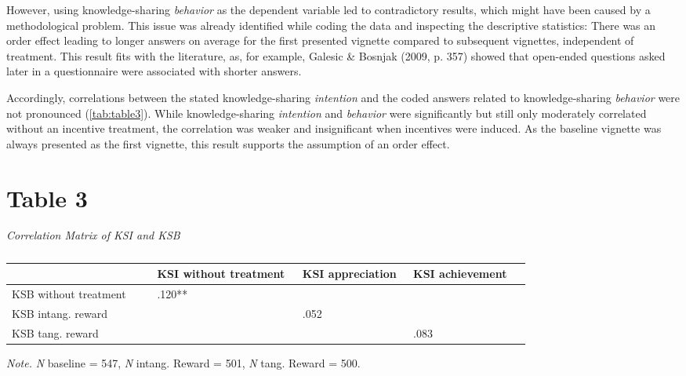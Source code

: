 \documentclass[twocolumn, serif, empirical, authordate]{jote-article}
\begin{document}
However, using knowledge-sharing \emph{behavior} as the dependent variable led to contradictory results, which might have been caused by a methodological problem. This issue was already identified while coding the data and inspecting the descriptive statistics: There was an order effect leading to longer answers on average for the first presented vignette compared to subsequent vignettes, independent of treatment.
This result fits with the literature, as, for example, Galesic \& Bosnjak (2009, p. 357) showed that open-ended questions asked later in a questionnaire were associated with shorter answers.

Accordingly, correlations between the stated knowledge-sharing \emph{intention} and the coded answers related to knowledge-sharing \emph{behavior} were not pronounced (\autoref{tab:table3}). While knowledge-sharing \emph{intention} and \emph{behavior} were significantly but still only moderately correlated without an incentive treatment, the correlation was weaker and insignificant when incentives were induced. As the baseline vignette was always presented as the first vignette, this result supports the assumption of an order effect.


\section*{Table 3}
\label{sec:Table 3}

\emph{Correlation Matrix of KSI and KSB} 

\begin{table*}[h!]\sffamily
\caption{}
\label{tab:table2}

\begin{tabularx}{\linewidth}{
>{\raggedright\arraybackslash}p{0.2193\linewidth}
>{\raggedright\arraybackslash}p{0.2116\linewidth}
>{\raggedright\arraybackslash}p{0.1669\linewidth}
>{\raggedright\arraybackslash}p{0.1714\linewidth}
}
       & \textbf{KSI without treatment} & KSI appreciation & KSI achievement \\ 
 \toprule 
 KSB without treatment & .120** &  &  \\ 
 KSB intang. reward &  & .052  &  \\ 
 KSB tang. reward &  &  & .083  \\ 

\end{tabularx}

\end{table*} 
\emph{Note.} \emph{N} baseline = 547, \emph{N} intang. Reward = 501, \emph{N} tang. Reward = 500.
\end{document}
